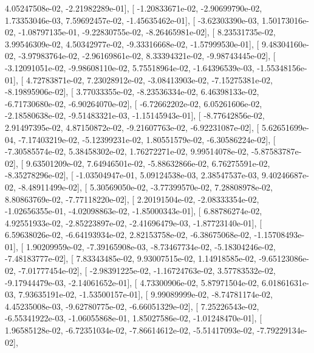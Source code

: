 \documentclass{article}
\begin{document}
          4.05247508e-02,  -2.21982289e-01],
       [ -1.20833671e-02,  -2.90699790e-02,   1.73353046e-03,
          7.59692457e-02,  -1.45635462e-01],
       [ -3.62303390e-03,   1.50173016e-02,  -1.08797135e-01,
         -9.22830755e-02,  -8.26465981e-02],
       [  8.23531735e-02,   3.99546309e-02,   4.50342977e-02,
         -9.33316668e-02,  -1.57999530e-01],
       [  9.48304160e-02,  -3.97983764e-02,  -2.96169861e-02,
          8.33394321e-02,  -9.98743445e-02],
       [ -3.12091051e-02,  -9.98608110e-02,   5.75518964e-02,
         -1.64396539e-03,  -1.55348156e-01],
       [  4.72783871e-02,   7.23028912e-02,  -3.08413903e-02,
         -7.15275381e-02,  -8.19895906e-02],
       [  3.77033355e-02,  -8.23536334e-02,   6.46398133e-02,
         -6.71730680e-02,  -6.90264070e-02],
       [ -6.72662202e-02,   6.05261606e-02,  -2.18580638e-02,
         -9.51483321e-03,  -1.15145943e-01],
       [ -8.77642856e-02,   2.91497395e-02,   4.87150872e-02,
         -9.21607763e-02,  -6.92231087e-02],
       [  5.62651699e-04,  -7.17403219e-02,  -5.12399231e-02,
          1.80551579e-02,  -6.30586224e-02],
       [ -7.30585574e-02,   5.38458302e-02,   1.76272271e-02,
          9.99514078e-02,  -5.87583787e-02],
       [  9.63501209e-02,   7.64946501e-02,  -5.88632866e-02,
          6.76275591e-02,  -8.35278296e-02],
       [ -1.03504947e-01,   5.09124538e-03,   2.38547537e-03,
          9.40246687e-02,  -8.48911499e-02],
       [  5.30569050e-02,  -3.77399570e-02,   7.28808978e-02,
          8.80863769e-02,  -7.77118220e-02],
       [  2.20191504e-02,  -2.08333354e-02,  -1.02656355e-01,
         -4.02098863e-02,  -1.85000343e-01],
       [  6.88786274e-02,   4.92551933e-02,  -2.85223897e-02,
         -2.41696479e-03,  -1.87723140e-01],
       [  6.59638026e-02,  -6.64193934e-02,   2.82153758e-02,
         -6.38675068e-02,  -1.15708493e-01],
       [  1.90209959e-02,  -7.39165908e-03,  -8.73467734e-02,
         -5.18304246e-02,  -7.48183777e-02],
       [  7.83343485e-02,   9.93007515e-02,   1.14918585e-02,
         -9.65123086e-02,  -7.01777454e-02],
       [ -2.98391225e-02,  -1.16724763e-02,   3.57783532e-02,
         -9.17944479e-03,  -2.14061652e-01],
       [  4.73300906e-02,   5.87971504e-02,   6.01861631e-03,
          7.93635191e-02,  -1.53500157e-01],
       [  9.99089999e-02,  -8.74781174e-02,   4.45235008e-03,
         -9.62780775e-02,  -6.66051329e-02],
       [  7.25226543e-02,  -6.55341922e-03,  -1.06055868e-01,
          1.85027586e-02,  -1.01248470e-01],
       [  1.96585128e-02,  -6.72351034e-02,  -7.86614612e-02,
         -5.51417093e-02,  -7.79229134e-02],
\end{document}
